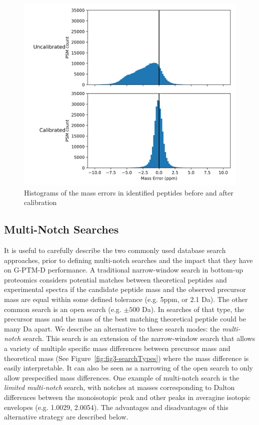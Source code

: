 \documentclass[journal=jprobs,manuscript=article]{achemso}
\begin{document}
\begin{figure}[H]
 \includegraphics{fig2-10ppmSearchCalib.png}
 \caption{Histograms of the mass errors in identified peptides before and after calibration}
 \label{fgr:fig2-10ppmSearchCalib}
\end{figure}

\newpage

\subsection{Multi-Notch Searches}

It is useful to carefully describe the two commonly used database search approaches, prior to defining multi-notch searches and the impact that they have on G-PTM-D performance.
A traditional narrow-window search in bottom-up proteomics considers potential matches between theoretical peptides and experimental spectra if the candidate peptide mass and the observed precursor mass are equal within some defined tolerance (e.g. 5ppm, or 2.1 Da).
The other common search is an open search (e.g. $\pm 500$ Da)\citep{Chick_2015,Kong_2017,Li_2016}.
In searches of that type, the precursor mass and the mass of the best matching theoretical peptide could be many Da apart.
We describe an alternative to these search modes: the \textit{multi-notch} search.
This search is an extension of the narrow-window search that allows a variety of multiple specific mass differences between precursor mass and theoretical mass (See Figure~\ref{fig:fig3-searchTypes}) where the mass difference is easily interpretable.
It can also be seen as a narrowing of the open search to only allow prespecified mass differences.
One example of multi-notch search is the \textit{limited multi-notch} search, with notches at masses corresponding to Dalton differences between the monoisotopic peak and other peaks in averagine\citep{Senko1995} isotopic envelopes (e.g. 1.0029, 2.0054).
The advantages and disadvantages of this alternative strategy are described below.
\end{document}
